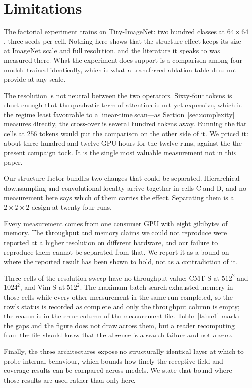 \section{Limitations}
\label{sec:limitations}

The factorial experiment trains on Tiny-ImageNet: two hundred classes at
$64 \times 64$, three seeds per cell. Nothing here shows that the structure
effect keeps its size at ImageNet scale and full resolution, and the
literature it speaks to was measured there. What the experiment does support
is a comparison among four models trained identically, which is what a
transferred ablation table does not provide at any scale.

The resolution is not neutral between the two operators. Sixty-four tokens is
short enough that the quadratic term of attention is not yet expensive, which
is the regime least favourable to a linear-time scan---as
Section~\ref{sec:complexity} measures directly, the cross-over is several
hundred tokens away. Running the flat cells at $256$ tokens would put the
comparison on the other side of it. We priced it: about three hundred and
twelve GPU-hours for the twelve runs, against the \HoursTotal{} the present
campaign took. It is the single most valuable measurement not in this paper.

Our structure factor bundles two changes that could be separated. Hierarchical
downsampling and convolutional locality arrive together in cells C and D, and
no measurement here says which of them carries the effect. Separating them is
a $2\times2\times2$ design at twenty-four runs.

Every measurement comes from one consumer GPU with eight gibibytes of memory.
The throughput and memory claims we could not reproduce were reported at a
higher resolution on different hardware, and our failure to reproduce them
cannot be separated from that. We report it as a bound on where the reported
result has been shown to hold, not as a contradiction of it.

Three cells of the resolution sweep have no throughput value: CMT-S at
$512^2$ and $1024^2$, and Vim-S at $512^2$. The maximum-batch search
exhausted memory in those cells while every other measurement in the same run
completed, so the row's status is recorded as complete and only the
throughput column is empty; the reason is in the error column of the
measurement file. Table~\ref{tab:e1} marks the gaps and the figure does not
draw across them, but a reader recomputing from the file should know that the
absence is a search failure and not a zero.

Finally, the three architectures expose no structurally identical layer at
which to probe internal behaviour, which bounds how finely the
receptive-field and coverage results can be compared across models. We state
that bound where those results are used rather than only here.
